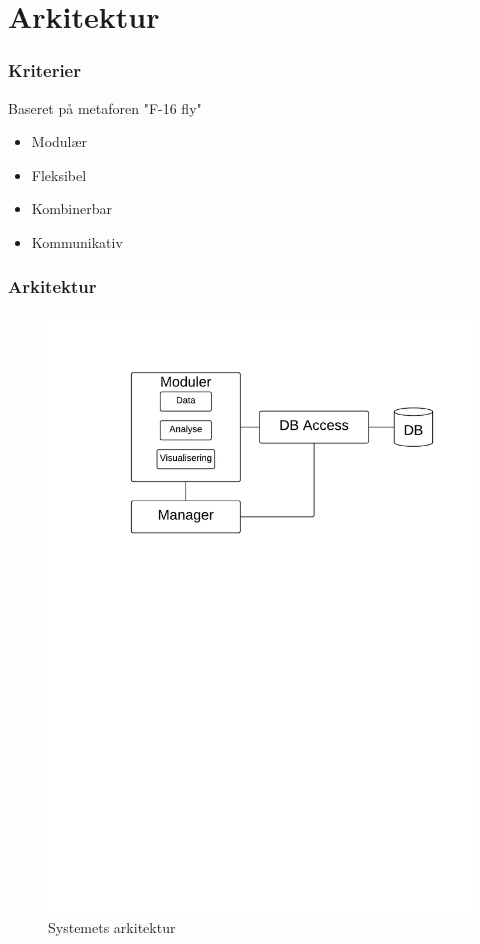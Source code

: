\section{Arkitektur}

\begin{frame}
\frametitle{Kriterier}
Baseret på metaforen "F-16 fly"
\begin{itemize}
\item Modulær
\item Fleksibel
\item Kombinerbar
\item Kommunikativ
\end{itemize}
\end{frame}

\begin{frame}
\frametitle{Arkitektur}
\begin{figure}[h]
	\centering						%
	\includegraphics[scale=0.5, trim = 1cm 17.5cm 1cm 1cm, clip]{../grafik/ArkitekturLucidChart}
	\caption{Systemets arkitektur}
  \label{arkitektur_udkast_1}
\end{figure}
\end{frame}

